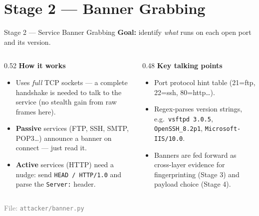 \documentclass[10pt,aspectratio=169]{beamer}
\begin{document}
\section{Stage 2 --- Banner Grabbing}
\begin{frame}{Stage 2 --- Service Banner Grabbing}
  \textbf{Goal:} identify \emph{what} runs on each open port and its version.
  \begin{columns}[T]
    \begin{column}{0.52\textwidth}
      \textbf{How it works}
      \begin{itemize}
        \item Uses \emph{full} TCP sockets --- a complete handshake is needed to
              talk to the service (no stealth gain from raw frames here).
        \item \textbf{Passive} services (FTP, SSH, SMTP, POP3\dots) announce a
              banner on connect --- just read it.
        \item \textbf{Active} services (HTTP) need a nudge: send
              \texttt{HEAD / HTTP/1.0} and parse the \texttt{Server:} header.
      \end{itemize}
    \end{column}
    \begin{column}{0.48\textwidth}
      \textbf{Key talking points}
      \begin{itemize}
        \item Port\,\textrightarrow\,protocol hint table (21=ftp, 22=ssh, 80=http\dots).
        \item Regex-parses version strings, e.g.\ \texttt{vsftpd 3.0.5},
              \texttt{OpenSSH\_8.2p1}, \texttt{Microsoft-IIS/10.0}.
        \item Banners are fed forward as \alert{cross-layer evidence} for
              fingerprinting (Stage 3) and payload choice (Stage 4).
      \end{itemize}
    \end{column}
  \end{columns}
  \vspace{0.4em}
  \footnotesize\textcolor{gray}{File: \texttt{attacker/banner.py}}
\end{frame}

\end{document}

